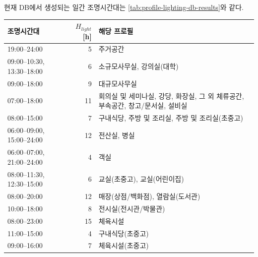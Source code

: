 현재 DB에서 생성되는 일간 조명시간대는
\cref{tab:profile-lighting-db-results}와 같다.

\begin{defaulttable}
  \caption{현재 내장 프로필에서 생성되는 일간 조명시간대}
  \label{tab:profile-lighting-db-results}
  {\small
  \renewcommand{\arraystretch}{1.12}
  \begin{tabularx}{\textwidth}{p{4.2cm}rX}
    \toprule
    조명시간대
      & $H_{light}$ [h]
      & 해당 프로필 \\ \midrule

    19:00--24:00
      & 5
      & 주거공간 \\

    09:00--10:30, 13:30--18:00
      & 6
      & 소규모사무실, 강의실(대학) \\

    09:00--18:00
      & 9
      & 대규모사무실 \\

    07:00--18:00
      & 11
      & 회의실 및 세미나실, 강당, 화장실,
        그 외 체류공간, 부속공간, 창고/문서실, 설비실 \\

    08:00--15:00
      & 7
      & 구내식당, 주방 및 조리실,
        주방 및 조리실(초중고) \\

    06:00--09:00, 15:00--24:00
      & 12
      & 전산실, 병실 \\

    06:00--07:00, 21:00--24:00
      & 4
      & 객실 \\

    08:00--11:30, 12:30--15:00
      & 6
      & 교실(초중고), 교실(어린이집) \\

    08:00--20:00
      & 12
      & 매장(상점/백화점), 열람실(도서관) \\

    10:00--18:00
      & 8
      & 전시실(전시관/박물관) \\

    08:00--23:00
      & 15
      & 체육시설 \\

    11:00--15:00
      & 4
      & 구내식당(초중고) \\

    09:00--16:00
      & 7
      & 체육시설(초중고) \\

    \bottomrule
  \end{tabularx}
  }
\end{defaulttable}


